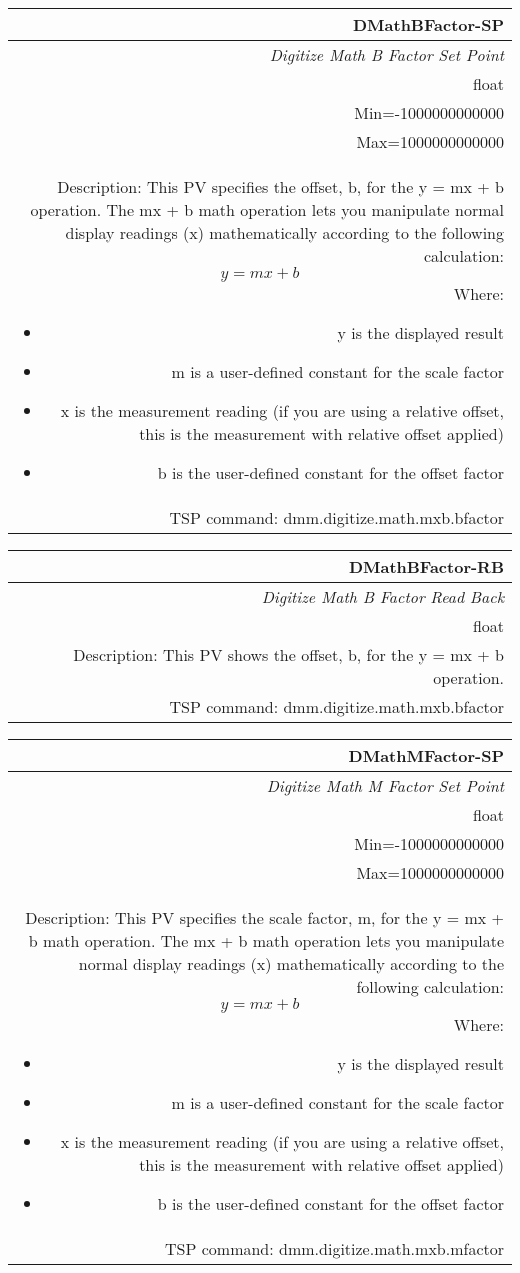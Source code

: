 \documentclass[openany]{article}
\begin{document}
		\begin{tabular}{N}
			\hline
			\bfseries DMathBFactor-SP\label{pv:dmathbfactor-sp} \\ \hline
			\emph{Digitize Math B Factor Set Point} \\
			float \\
			Min=-1000000000000 \\
			Max=1000000000000 \\
			Description: This PV specifies the offset, b, for the y = mx + b operation. The mx + b math operation lets you manipulate normal display readings (x) mathematically according to the following calculation: $$ y = mx + b $$ Where: \begin{itemize} \item y is the displayed result \item m is a user-defined constant for the scale factor \item x is the measurement reading (if you are using a relative offset, this is the measurement with relative offset applied) \item b is the user-defined constant for the offset factor \end{itemize} \\
			TSP command: dmm.digitize.math.mxb.bfactor
		\end{tabular}

		\begin{tabular}{N}
			\hline
			\bfseries DMathBFactor-RB\label{pv:dmathbfactor-rb} \\ \hline
			\emph{Digitize Math B Factor Read Back} \\
			float \\
			Description: This PV shows the offset, b, for the y = mx + b operation. \\
			TSP command: dmm.digitize.math.mxb.bfactor
		\end{tabular}

		\begin{tabular}{N}
			\hline
			\bfseries DMathMFactor-SP\label{pv:dmathmfactor-sp} \\ \hline
			\emph{Digitize Math M Factor Set Point} \\
			float \\
			Min=-1000000000000 \\
			Max=1000000000000 \\
			Description: This PV specifies the scale factor, m, for the y = mx + b math operation. The mx + b math operation lets you manipulate normal display readings (x) mathematically according to the following calculation: $$ y = mx + b $$ Where: \begin{itemize} \item y is the displayed result \item m is a user-defined constant for the scale factor \item x is the measurement reading (if you are using a relative offset, this is the measurement with relative offset applied) \item b is the user-defined constant for the offset factor \end{itemize} \\
			TSP command: dmm.digitize.math.mxb.mfactor
		\end{tabular}
\end{document}
